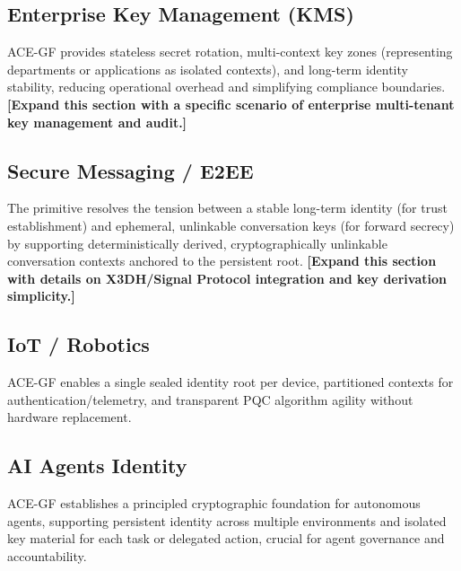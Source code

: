 \documentclass[11pt,a4paper]{article}
\begin{document}
\subsection{Enterprise Key Management (KMS)}
ACE-GF provides stateless secret rotation, multi-context key zones (representing departments or applications as isolated contexts), and long-term identity stability, reducing operational overhead and simplifying compliance boundaries.
\textbf{[Expand this section with a specific scenario of enterprise multi-tenant key management and audit.]}

\subsection{Secure Messaging / E2EE}
The primitive resolves the tension between a stable long-term identity (for trust establishment) and ephemeral, unlinkable conversation keys (for forward secrecy) by supporting deterministically derived, cryptographically unlinkable conversation contexts anchored to the persistent root.
\textbf{[Expand this section with details on X3DH/Signal Protocol integration and key derivation simplicity.]}

\subsection{IoT / Robotics}
ACE-GF enables a single sealed identity root per device, partitioned contexts for authentication/telemetry, and transparent PQC algorithm agility without hardware replacement.

\subsection{AI Agents Identity}
ACE-GF establishes a principled cryptographic foundation for autonomous agents, supporting persistent identity across multiple environments and isolated key material for each task or delegated action, crucial for agent governance and accountability.
\end{document}

